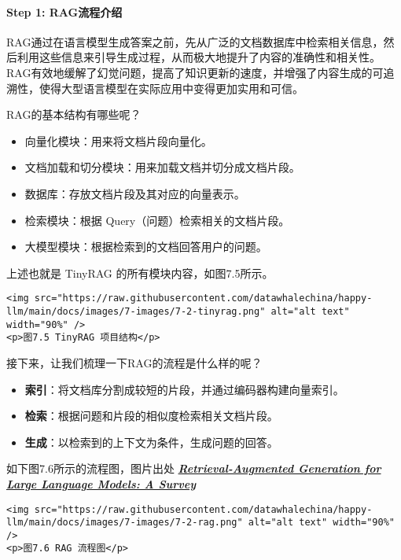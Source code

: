 \documentclass[
]{article}
\providecommand{\tightlist}{%
  \setlength{\itemsep}{0pt}\setlength{\parskip}{0pt}}
\begin{document}
\paragraph{Step 1:
RAG流程介绍}\label{step-1-ragux6d41ux7a0bux4ecbux7ecd}

RAG通过在语言模型生成答案之前，先从广泛的文档数据库中检索相关信息，然后利用这些信息来引导生成过程，从而极大地提升了内容的准确性和相关性。RAG有效地缓解了幻觉问题，提高了知识更新的速度，并增强了内容生成的可追溯性，使得大型语言模型在实际应用中变得更加实用和可信。

RAG的基本结构有哪些呢？

\begin{itemize}
\tightlist
\item
  向量化模块：用来将文档片段向量化。
\item
  文档加载和切分模块：用来加载文档并切分成文档片段。
\item
  数据库：存放文档片段及其对应的向量表示。
\item
  检索模块：根据 Query（问题）检索相关的文档片段。
\item
  大模型模块：根据检索到的文档回答用户的问题。
\end{itemize}

上述也就是 TinyRAG 的所有模块内容，如图7.5所示。

\begin{verbatim}
<img src="https://raw.githubusercontent.com/datawhalechina/happy-llm/main/docs/images/7-images/7-2-tinyrag.png" alt="alt text" width="90%" />
<p>图7.5 TinyRAG 项目结构</p>
\end{verbatim}

接下来，让我们梳理一下RAG的流程是什么样的呢？

\begin{itemize}
\tightlist
\item
  \textbf{索引}：将文档库分割成较短的片段，并通过编码器构建向量索引。
\item
  \textbf{检索}：根据问题和片段的相似度检索相关文档片段。
\item
  \textbf{生成}：以检索到的上下文为条件，生成问题的回答。
\end{itemize}

如下图7.6所示的流程图，图片出处
\textbf{\emph{\href{https://arxiv.org/pdf/2312.10997.pdf}{Retrieval-Augmented
Generation for Large Language Models: A Survey}}}

\begin{verbatim}
<img src="https://raw.githubusercontent.com/datawhalechina/happy-llm/main/docs/images/7-images/7-2-rag.png" alt="alt text" width="90%" />
<p>图7.6 RAG 流程图</p>
\end{verbatim}
\end{document}
